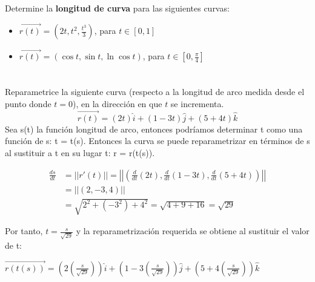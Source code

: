 \documentclass[12pt]{article}
\begin{document}
\section{}
Determine la \textbf{longitud de curva} para las siguientes curvas:
\begin{itemize}[format=\textbf]

\item $\vec{r(t)}=\left(2t,t^2,\frac{t^3}{3}\right)$, para $t \in [0,1]$

\item $\vec{r(t)}=\left(\cos{t},\sin{t},\ln{\cos{t}}\right)$, para $t \in \left[0,\frac{\pi}{4}\right]$

\end{itemize}

\section{}
Reparametrice la siguiente curva (respecto a la longitud de arco medida desde el punto donde $t = 0$), en la dirección en que $t$ se incrementa.
$$ \vec{r(t)}=(2t)\hat{i}+(1-3t)\hat{j}+(5+4t)\hat{k}$$
Sea s(t) la función longitud de arco, entonces podríamos determinar t como una función de s: t = t(s). Entonces la curva se puede reparametrizar en términos de s al sustituir a t en su lugar t: r = r(t(s)).

\begin{align*}
  \frac{ds}{dt} &= || r'(t)|| = \left|\left| \left( \frac{d}{dt} (2t), \frac{d}{dt} (1-3t),   \frac{d}{dt} (5+4t)  \right) \right| \right| \\
  &=  \left|\left| \left(2, -3,  4  \right) \right| \right| \\
  &= \sqrt{2^2+ (-3^2) + 4^2} = \sqrt{4+ 9 + 16} = \sqrt{29}
\end{align*}

Por tanto, $t = \frac{s}{\sqrt{29}}$ y la reparametrización requerida se obtiene al sustituir el valor de t:

$ \vec{r(t(s))} = (2(\frac{s}{\sqrt{29}}))\hat{i}+(1-3( \frac{s}{\sqrt{29}}))\hat{j}+(5+4( \frac{s}{\sqrt{29}}))\hat{k} $
\end{document}
